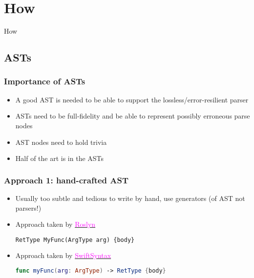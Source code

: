 \documentclass[compress,12pt,xcolor={dvipsnames}]{beamer}
\let\oldhref\href
\renewcommand{\href}[2]{\oldhref{#1}{\textcolor{magenta}{#2}}}
\begin{document}
\section{How}

\begin{frame}[standout]
	\centering\large
	How
\end{frame}

\subsection{ASTs}

\begin{frame}
	\frametitle{Importance of ASTs}
	\begin{itemize}
		\item A good AST is needed to be able to support the lossless/error-resilient parser
		\item ASTs need to be full-fidelity and be able to represent possibly erroneous parse nodes
		\item AST nodes need to hold trivia
		\item Half of the art is in the ASTs
	\end{itemize}
\end{frame}


\begin{frame}[fragile]
	\frametitle{Approach 1: hand-crafted AST}
	\begin{itemize}
		\item Usually too subtle and tedious to write by hand, use generators (of AST not parsers!)
		\item Approach taken by \href{https://github.com/dotnet/roslyn/blob/Visual-Studio-2019-Version-16.11/src/Compilers/CSharp/Portable/Generated/CSharpSyntaxGenerator/CSharpSyntaxGenerator.SourceGenerator/Syntax.xml.Internal.Generated.cs}{Roslyn}
		      \begin{lstlisting}[language={[Sharp]C}, gobble=12, numbers=none]
                  RetType MyFunc(ArgType arg) {body}
              \end{lstlisting}
		\item Approach taken by \href{https://github.com/apple/swift-syntax/blob/caab6bb82e0e81395551ec1032984f4b325f7a35/Sources/SwiftSyntax/generated/syntaxNodes/SyntaxNodesEF.swift\#L3368}{SwiftSyntax}
		      \begin{lstlisting}[language=Swift, gobble=18, numbers=none]
                  func myFunc(arg: ArgType) -> RetType {body}
              \end{lstlisting}
	\end{itemize}
\end{frame}
\end{document}
